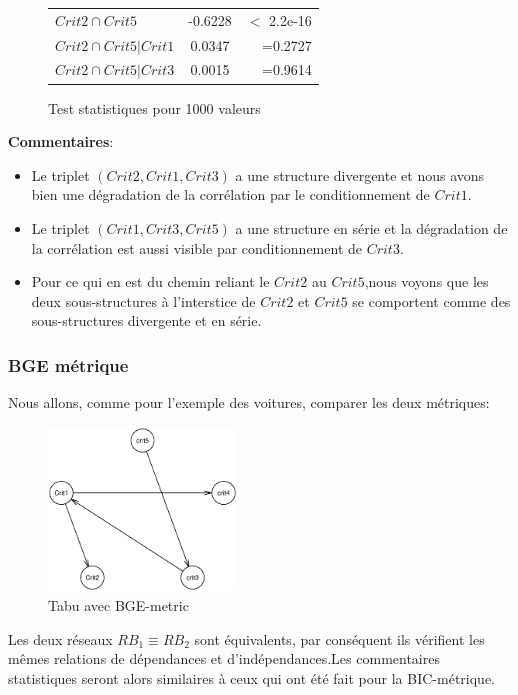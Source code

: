 \documentclass[a4paper]{article}
\begin{document}
\begin{appendices}
\begin{figure}[H]
\begin{center}
\begin{tabular}{|l|c|r|}
$Crit2  \cap  Crit5$ & -0.6228 &  $<$ 2.2e-16 \\
$Crit2  \cap  Crit5|Crit1$ & 0.0347& =0.2727\\
$Crit2 \cap Crit5 |Crit3$ &   0.0015& =0.9614 \\
\hline
\end{tabular}
\end{center}
\caption{Test statistiques pour 1000 valeurs }
\end{figure}
\textbf{Commentaires}:
\begin{itemize}
\item Le triplet $(Crit2,Crit1,Crit3)$ a une structure divergente et nous avons bien une dégradation de la corrélation par le conditionnement de $Crit1$.

\item Le triplet $(Crit1,Crit3,Crit5)$ a une structure en série et la dégradation de la corrélation est aussi visible par conditionnement de $Crit3$.

\item Pour ce qui en est du chemin reliant le $Crit2$ au $Crit5$,nous voyons que les deux sous-structures à l'interstice de $Crit2$ et $Crit5$ se comportent comme des sous-structures divergente et en  série.{\\}

\end{itemize}
\newpage
\subsubsection{BGE métrique}
Nous allons, comme pour l'exemple des voitures, comparer les deux métriques:

\begin{figure}[H] 
    \center 
    \includegraphics[width=5cm]{tabubge.eps} 
    \caption{Tabu avec BGE-metric} 
\end{figure} 

Les deux réseaux $RB_1 \equiv RB_2$ sont équivalents, par conséquent ils vérifient les mêmes relations de dépendances et d'indépendances.Les commentaires statistiques seront alors similaires à ceux qui ont été fait pour la BIC-métrique.



\end{appendices}
\end{document}
